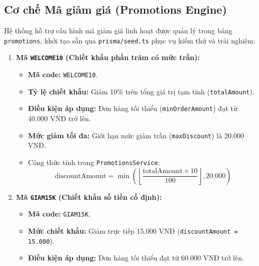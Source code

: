 \subsection{Cơ chế Mã giảm giá (Promotions Engine)}
Hệ thống hỗ trợ cấu hình mã giảm giá linh hoạt được quản lý trong bảng \texttt{promotions}, khởi tạo sẵn qua \texttt{prisma/seed.ts} phục vụ kiểm thử và trải nghiệm:
\begin{enumerate}
    \item \textbf{Mã \texttt{WELCOME10} (Chiết khấu phần trăm có mức trần):}
    \begin{itemize}
        \item \textbf{Mã code:} \texttt{WELCOME10}.
        \item \textbf{Tỷ lệ chiết khấu:} Giảm 10\% trên tổng giá trị tạm tính (\texttt{totalAmount}).
        \item \textbf{Điều kiện áp dụng:} Đơn hàng tối thiểu (\texttt{minOrderAmount}) đạt từ 40.000 VNĐ trở lên.
        \item \textbf{Mức giảm tối đa:} Giới hạn mức giảm trần (\texttt{maxDiscount}) là 20.000 VNĐ.
        \item Công thức tính trong \texttt{PromotionsService}:
        \[
        \text{discountAmount} = \min\left( \left\lfloor \frac{\text{totalAmount} \times 10}{100} \right\rfloor, 20.000 \right)
        \]
    \end{itemize}
    \item \textbf{Mã \texttt{GIAM15K} (Chiết khấu số tiền cố định):}
    \begin{itemize}
        \item \textbf{Mã code:} \texttt{GIAM15K}.
        \item \textbf{Mức chiết khấu:} Giảm trực tiếp 15.000 VNĐ (\texttt{discountAmount = 15.000}).
        \item \textbf{Điều kiện áp dụng:} Đơn hàng tối thiểu đạt từ 60.000 VNĐ trở lên.
    \end{itemize}
\end{enumerate}

